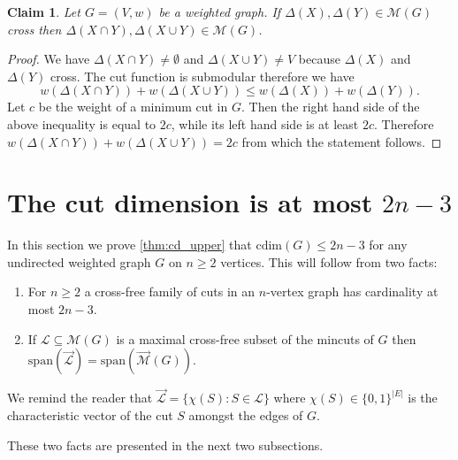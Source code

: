 \documentclass[10pt,a4paper]{article}
\newcommand{\Lcal}{\mathcal{L}}
\newcommand{\M}{\mathcal{M}}
\newcommand{\laspan}{\mathrm{span}}
\newcommand{\cd}{\mathrm{cdim}}
\newcommand{\1}{\mathbf{1}}
\newtheorem{claim}[theorem]{Claim}
\theoremstyle{definition}
\begin{document}
\begin{claim}
\label{claim:mincuts}
Let $G=(V,w)$ be a weighted graph.
If $\Delta(X), \Delta(Y) \in \M(G)$ cross then
$\Delta(X \cap Y), \Delta(X \cup Y)  \in \M(G)$.
\end{claim}

\begin{proof}
We have $\Delta(X \cap Y) \neq \emptyset $ and $ \Delta(X \cup Y) \neq V$ because $\Delta(X)$ and $\Delta(Y)$ cross. The cut function is submodular therefore we have
\begin{equation*}
\label{eq:mincuts}
w(\Delta(X \cap Y) ) + w(\Delta(X \cup Y) ) \leq w(\Delta(X)) + w(\Delta(Y)).
\end{equation*}
Let $c$ be the weight of a minimum cut in $G$. Then the right hand side of the above inequality
is equal to $2c$, while its left hand side is at least $2c$. Therefore
$w(\Delta(X \cap Y) ) + w(\Delta(X \cup Y) ) = 2c$ from which the statement follows.
\end{proof}


\setcounter{section}{3}\setcounter{theorem}{15}\section{The cut dimension is at most $2n-3$}\label{sec:upper}
In this section we prove \cref{thm:cd_upper} that $\cd(G) \le 2n-3$ for any undirected weighted graph $G$ on $n \ge 2$ vertices.  This will follow from
two facts:
\begin{enumerate}
  \item For $n \ge 2$ a cross-free family of cuts in an $n$-vertex graph has cardinality at most $2n-3$.
  \item If $\Lcal \subseteq \M(G)$ is a maximal cross-free subset of the mincuts of $G$
  then $\laspan(\vec{\Lcal}) = \laspan(\vec{\M}(G))$.
\end{enumerate}
We remind the reader that $\vec{\Lcal} = \{\chi(S) : S \in \Lcal\}$ where $\chi(S) \in \{0,1\}^{|E|}$ is the characteristic
vector of the cut $S$ amongst the edges of $G$.

These two facts are presented in the next two subsections.
\end{document}
